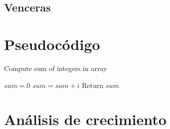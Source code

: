 \documentclass{article}
\begin{document}
	\subsection{Venceras}
		\paragraph{}





\section{Pseudocódigo}
\begin{algorithm}
    \caption{Compute sum of integers in array}
        \label{array-sum}
        \begin{algorithmic}[1]
            \State $sum = 0$
                \State $sum = sum + i$
            \EndFor
            \State Return $sum$
            \EndProcedure
        \end{algorithmic}
    \end{algorithm}
\section{Análisis de crecimiento}
\end{document}
